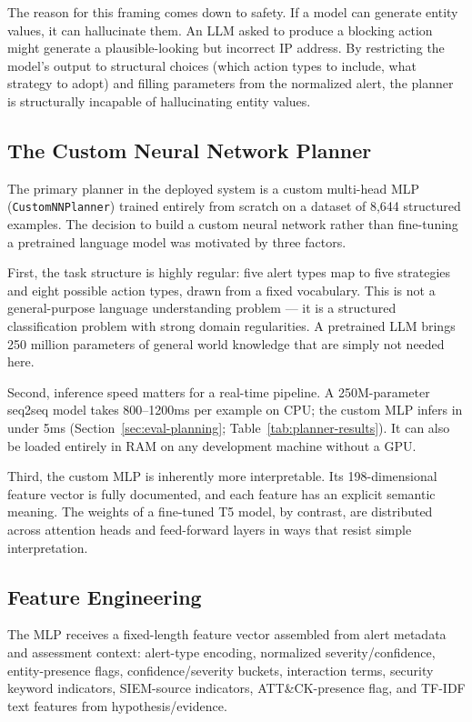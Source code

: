 The reason for this framing comes down to safety. If a model can generate entity values, it can hallucinate them. An LLM asked to produce a blocking action might generate a plausible-looking but incorrect IP address. By restricting the model's output to structural choices (which action types to include, what strategy to adopt) and filling parameters from the normalized alert, the planner is structurally incapable of hallucinating entity values.

\subsection{The Custom Neural Network Planner}

The primary planner in the deployed system is a custom multi-head MLP (\texttt{CustomNNPlanner}) trained entirely from scratch on a dataset of 8,644 structured examples. The decision to build a custom neural network rather than fine-tuning a pretrained language model was motivated by three factors.

First, the task structure is highly regular: five alert types map to five strategies and eight possible action types, drawn from a fixed vocabulary. This is not a general-purpose language understanding problem --- it is a structured classification problem with strong domain regularities. A pretrained LLM brings 250 million parameters of general world knowledge that are simply not needed here.

Second, inference speed matters for a real-time pipeline. A 250M-parameter seq2seq model takes 800--1200ms per example on CPU; the custom MLP infers in under 5ms (Section~\ref{sec:eval-planning}; Table~\ref{tab:planner-results}). It can also be loaded entirely in RAM on any development machine without a GPU.

Third, the custom MLP is inherently more interpretable. Its 198-dimensional feature vector is fully documented, and each feature has an explicit semantic meaning. The weights of a fine-tuned T5 model, by contrast, are distributed across attention heads and feed-forward layers in ways that resist simple interpretation.

\subsection{Feature Engineering}

The MLP receives a fixed-length feature vector assembled from alert metadata and assessment context: alert-type encoding, normalized severity/confidence, entity-presence flags, confidence/severity buckets, interaction terms, security keyword indicators, SIEM-source indicators, ATT\&CK-presence flag, and TF-IDF text features from hypothesis/evidence.

